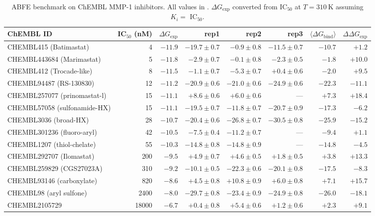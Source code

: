 \documentclass[11pt,a4paper]{article}
\newcommand{\dG}{\Delta G}
\newcommand{\dGbind}{\dG_{\mathrm{bind}}}
\newcommand{\dGexp}{\dG_{\mathrm{exp}}}
\newcommand{\kcalmol}{\mathrm{kcal\,mol^{-1}}}
\begin{document}
\begin{table}[ht]
\centering
\caption{ABFE benchmark on ChEMBL MMP-1 inhibitors. All values in
\unit{\kcalmol}. $\dGexp$ converted from IC$_{50}$ at
$T = \SI{310}{\kelvin}$ assuming $K_i = $ IC$_{50}$.}
\label{tab:abfe}
\small
\begin{tabular}{lrrrrrrr}
\toprule
ChEMBL ID & IC$_{50}$ (nM) & $\dGexp$ & rep1 & rep2 & rep3 & $\langle\dGbind\rangle$ & $\Delta\dGexp$ \\
\midrule
CHEMBL415 (Batimastat)       &     4 & $-11.9$ & $-19.7 \pm 0.7$ & $-0.9 \pm 0.8$ & $-11.5 \pm 0.7$ & $-10.7$ & $+1.2$ \\
CHEMBL443684 (Marimastat)    &     5 & $-11.8$ & $-2.9 \pm 0.7$  & $-0.1 \pm 0.8$ & $-2.3 \pm 0.5$  & $-1.8$  & $+10.0$ \\
CHEMBL412 (Trocade-like)     &     8 & $-11.5$ & $-1.1 \pm 0.7$  & $-5.3 \pm 0.7$ & $+0.4 \pm 0.6$  & $-2.0$  & $+9.5$ \\
CHEMBL94487 (RS-130830)      &    12 & $-11.2$ & $-20.9 \pm 0.6$ & $-21.0 \pm 0.6$ & $-24.9 \pm 0.6$ & $-22.3$ & $-11.1$ \\
CHEMBL257077 (prinomastat-l) &    15 & $-11.1$ & $+8.6 \pm 0.6$  & $+6.0 \pm 0.6$  & ---             & $+7.3$  & $+18.4$ \\
CHEMBL57058 (sulfonamide-HX) &    15 & $-11.1$ & $-19.5 \pm 0.7$ & $-11.8 \pm 0.7$ & $-20.7 \pm 0.9$ & $-17.3$ & $-6.2$ \\
CHEMBL3036 (broad-HX)        &    28 & $-10.7$ & $-20.4 \pm 0.6$ & $-26.8 \pm 0.7$ & $-30.5 \pm 0.8$ & $-25.9$ & $-15.2$ \\
CHEMBL301236 (fluoro-aryl)   &    42 & $-10.5$ & $-7.5 \pm 0.4$  & $-11.2 \pm 0.7$ & ---             & $-9.4$  & $+1.1$ \\
CHEMBL1207 (thiol-chelate)   &    55 & $-10.3$ & $-14.8 \pm 0.8$ & $-14.8 \pm 0.9$ & ---             & $-14.8$ & $-4.5$ \\
CHEMBL292707 (Ilomastat)     &   200 & $-9.5$  & $+4.9 \pm 0.7$  & $+4.6 \pm 0.5$  & $+1.8 \pm 0.5$  & $+3.8$  & $+13.3$ \\
CHEMBL259829 (CGS27023A)     &   310 & $-9.2$  & $-10.1 \pm 0.5$ & $-22.3 \pm 0.6$ & $-20.1 \pm 0.8$ & $-17.5$ & $-8.3$ \\
CHEMBL93146 (carboxylate)    &   820 & $-8.6$  & $+4.5 \pm 0.8$  & $+10.8 \pm 0.9$ & $+6.0 \pm 0.8$  & $+7.1$  & $+15.7$ \\
CHEMBL98 (aryl sulfone)      &  2400 & $-8.0$  & $-29.7 \pm 0.8$ & $-23.4 \pm 0.9$ & $-24.9 \pm 0.8$ & $-26.0$ & $-18.1$ \\
CHEMBL2105729                & 18000 & $-6.7$  & $+0.4 \pm 0.8$  & $+5.4 \pm 0.6$  & $+1.2 \pm 0.6$  & $+2.3$  & $+9.1$ \\
\bottomrule
\end{tabular}
\end{table}
\end{document}
